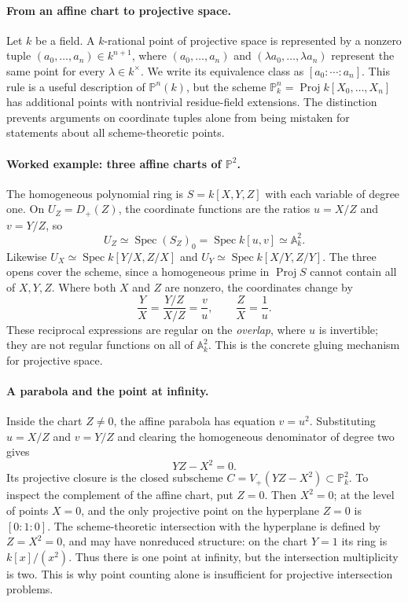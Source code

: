 \paragraph{From an affine chart to projective space.}
Let \(k\) be a field.  A \(k\)-rational point of projective space is
represented by a nonzero tuple
\((a_0,\ldots,a_n)\in k^{n+1}\), where
\((a_0,\ldots,a_n)\) and \((\lambda a_0,\ldots,\lambda a_n)\)
represent the same point for every \(\lambda\in k^\times\).
We write its equivalence class as \([a_0:\cdots:a_n]\).
This rule is a useful description of \(\mathbb P^n(k)\), but the
scheme \(\mathbb P^n_k=\operatorname{Proj}k[X_0,\ldots,X_n]\)
has additional points with nontrivial residue-field extensions.
The distinction prevents arguments on coordinate tuples alone from
being mistaken for statements about all scheme-theoretic points.

\paragraph{Worked example: three affine charts of \(\mathbb P^2\).}
The homogeneous polynomial ring is
\(S=k[X,Y,Z]\) with each variable of degree one.
On \(U_Z=D_+(Z)\), the coordinate functions are the ratios
\(u=X/Z\) and \(v=Y/Z\), so
\[
 U_Z\simeq\operatorname{Spec}(S_Z)_0
       =\operatorname{Spec}k[u,v]\simeq\mathbb A_k^2.
\]
Likewise \(U_X\simeq\operatorname{Spec}k[Y/X,Z/X]\) and
\(U_Y\simeq\operatorname{Spec}k[X/Y,Z/Y]\).
The three opens cover the scheme, since a homogeneous prime in
\(\operatorname{Proj}S\) cannot contain all of \(X,Y,Z\).
Where both \(X\) and \(Z\) are nonzero, the coordinates change by
\[
  \frac{Y}{X}=\frac{Y/Z}{X/Z}=\frac{v}{u},\qquad
  \frac{Z}{X}=\frac{1}{u}.
\]
These reciprocal expressions are regular on the \emph{overlap},
where \(u\) is invertible; they are not regular functions on all of
\(\mathbb A_k^2\).  This is the concrete gluing mechanism for
projective space.

\paragraph{A parabola and the point at infinity.}
Inside the chart \(Z\ne0\), the affine parabola has equation
\(v=u^2\).  Substituting \(u=X/Z\) and \(v=Y/Z\) and clearing the
homogeneous denominator of degree two gives
\[
 YZ-X^2=0.
\]
Its projective closure is the closed subscheme
\(C=V_+(YZ-X^2)\subset\mathbb P_k^2\).
To inspect the complement of the affine chart, put \(Z=0\).
Then \(X^2=0\); at the level of points \(X=0\), and the only
projective point on the hyperplane \(Z=0\) is \([0:1:0]\).
The scheme-theoretic intersection with the hyperplane is defined by
\(Z=X^2=0\), and may have nonreduced structure: on the chart \(Y=1\)
its ring is \(k[x]/(x^2)\).  Thus there is one point at infinity,
but the intersection multiplicity is two.
This is why point counting alone is insufficient for projective
intersection problems.

